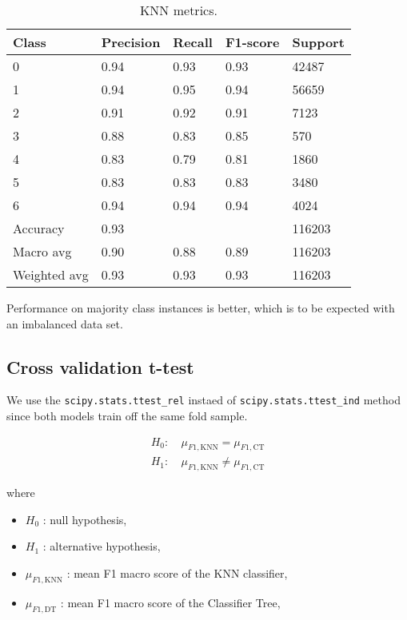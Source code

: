 \documentclass[conference]{IEEEtran}
\begin{document}
\begin{table}[htbp]
	\centering
	\begin{tabular}{lllll}
		\toprule
		\textbf{Class} & \textbf{Precision} & \textbf{Recall} & \textbf{F1-score} & \textbf{Support} \\
		\midrule
		0 & 0.94 & 0.93 & 0.93 & 42487 \\
		1 & 0.94 & 0.95 & 0.94 & 56659 \\
		2 & 0.91 & 0.92 & 0.91 & 7123 \\
		3 & 0.88 & 0.83 & 0.85 & 570 \\
		4 & 0.83 & 0.79 & 0.81 & 1860 \\
		5 & 0.83 & 0.83 & 0.83 & 3480 \\
		6 & 0.94 & 0.94 & 0.94 & 4024 \\
		\midrule
		Accuracy & 0.93 & & & 116203 \\
		Macro avg & 0.90 & 0.88 & 0.89 & 116203 \\
		Weighted avg & 0.93 & 0.93 & 0.93 & 116203 \\
		\bottomrule
	\end{tabular}
	\caption{KNN metrics.}
	\label{tab:knn-result}
\end{table}



Performance on majority class instances is better, which is to be expected with an imbalanced data set.




\subsection{Cross validation t-test}

We use the \texttt{scipy.stats.ttest\_rel} instaed of \texttt{scipy.stats.ttest\_ind} method since both models train off the same fold sample.

\begin{align*}
	H_{0}:& \ \mu_{F1,\text{KNN}} = \mu_{F1,\text{CT}} \\[6pt]
	H_{1}:& \ \mu_{F1,\text{KNN}} \neq \mu_{F1,\text{CT}}
\end{align*}

where 
\begin{itemize}
	\item $H_{0}$ : null hypothesis,
	\item $H_{1}$ : alternative hypothesis,
	\item $\mu_{F1,\text{KNN}}$ : mean F1 macro score of the KNN classifier,
	\item $\mu_{F1,\text{DT}}$ : mean F1 macro score of the Classifier Tree,
\end{itemize}
\end{document}
